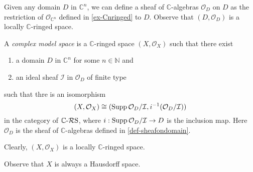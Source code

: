 \begin{definition}\label{def-sheafondomain}
Given any domain $D$ in $\mathbb{C}^n$, we can define a sheaf of $\mathbb{C}$-algebras $\mathcal{O}_D$ on $D$ as the restriction of $\mathcal{O}_{\mathbb{C}^n}$ defined in \cref{ex-Cnringed} to $D$. Observe that $(D,\mathcal{O}_D)$ is a locally $\mathbb{C}$-ringed space. 
\end{definition}


\begin{definition}\label{def-complexmodelspace}
    A \emph{complex model space} is a $\mathbb{C}$-ringed space $(X,\mathcal{O}_X)$ such that there exist
    \begin{enumerate}
        \item a domain $D$ in $\mathbb{C}^n$ for some $n\in \mathbb{N}$ and
        \item an ideal sheaf $\mathcal{I}$ in $\mathcal{O}_D$ of finite type
    \end{enumerate}
    such that thre is an isomorphism
    \[
        (X,\mathcal{O}_X)\cong (\operatorname{Supp} \mathcal{O}_D/\mathcal{I},i^{-1}(\mathcal{O}_D/\mathcal{I}))
    \]
    in the category of $\mathbb{C}\text{-}\mathcal{R}\mathrm{S}$, where $i:\operatorname{Supp} \mathcal{O}_D/\mathcal{I}\rightarrow D$ is the inclusion map. Here $\mathcal{O}_D$ is the sheaf of $\mathbb{C}$-algebras defined in \cref{def-sheafondomain}.

    Clearly, $(X,\mathcal{O}_X)$ is a locally $\mathbb{C}$-ringed space.
\end{definition}
Observe that $X$ is always a Hausdorff space.


